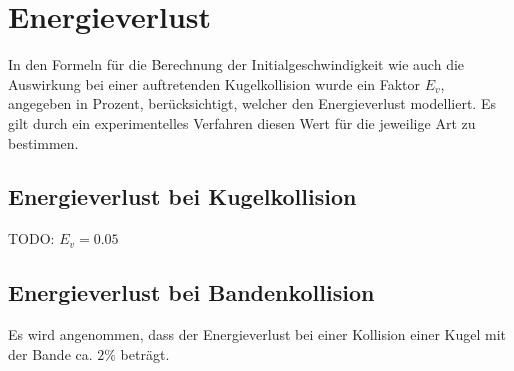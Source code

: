 \section{Energieverlust}
In den Formeln für die Berechnung der Initialgeschwindigkeit wie auch die Auswirkung bei einer auftretenden Kugelkollision
wurde ein Faktor $E_v$, angegeben in Prozent, berücksichtigt, welcher den Energieverlust modelliert.
Es gilt durch ein experimentelles Verfahren diesen Wert für die jeweilige Art zu bestimmen.

\subsection{Energieverlust bei Kugelkollision}
TODO: $E_v = 0.05$

\subsection{Energieverlust bei Bandenkollision}
Es wird angenommen, dass der Energieverlust bei einer Kollision einer Kugel mit der Bande ca. $2\%$ beträgt\cite{10.1243/09544062JMES1964}.

